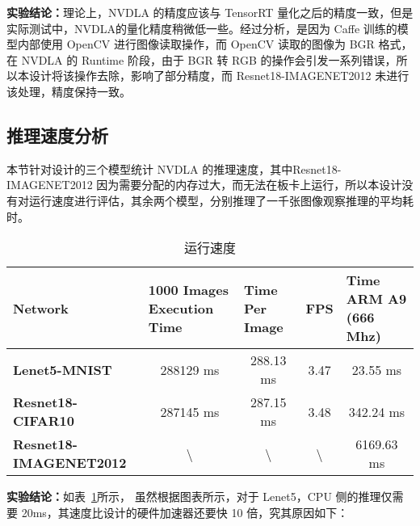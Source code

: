 \textbf{实验结论：}理论上，NVDLA 的精度应该与 TensorRT 量化之后的精度一致，但是实际测试中，NVDLA的量化精度稍微低一些。经过分析，是因为 Caffe 训练的模型内部使用 OpenCV 进行图像读取操作，而 OpenCV 读取的图像为 BGR 格式，在 NVDLA 的 Runtime 阶段，由于 BGR 转 RGB 的操作会引发一系列错误，所以本设计将该操作去除，影响了部分精度，而 Resnet18-IMAGENET2012 未进行该处理，精度保持一致。

\subsection{推理速度分析}

本节针对设计的三个模型统计 NVDLA 的推理速度，其中Resnet18-IMAGENET2012 因为需要分配的内存过大，而无法在板卡上运行，所以本设计没有对运行速度进行评估，其余两个模型，分别推理了一千张图像观察推理的平均耗时。

\begin{table}[!htbp]
    \caption{运行速度}
    \label{tab:Execution Time}
    \centering
    \footnotesize%
    \setlength{\tabcolsep}{4pt}%
    \renewcommand{\arraystretch}{1.2}%
    \begin{tabular}{lcccc}
        \toprule
        \textbf{Network}                                   & \multicolumn{1}{l}{\textbf{1000 Images Execution Time}} & \multicolumn{1}{l}{\textbf{Time Per Image}} & \textbf{FPS}     & \multicolumn{1}{l}{\textbf{Time ARM A9 (666 Mhz)}} \\
        \midrule
        \textbf{Lenet5-MNIST}          & 288129 ms                                               & 288.13 ms                                   & 3.47             & 23.55 ms                                            \\
        \textbf{Resnet18-CIFAR10}      & 287145 ms                                               & 287.15 ms                                   & 3.48             & 342.24 ms                                          \\
        \textbf{Resnet18-IMAGENET2012} & \textbackslash{}                                        & \textbackslash{}                            & \textbackslash{} & 6169.63 ms                                         \\
        \bottomrule                   
    \end{tabular}
\end{table}

\textbf{实验结论：}如表~\ref{tab:Execution Time}所示，
虽然根据图表所示，对于 Lenet5，CPU 侧的推理仅需要 20ms，其速度比设计的硬件加速器还要快 10 倍，究其原因如下：


